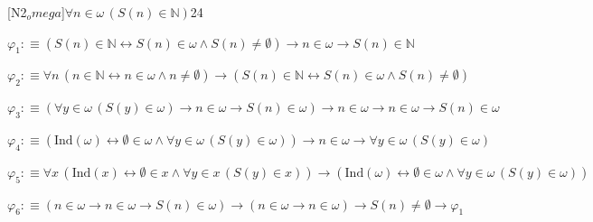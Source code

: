 \begin{fullproof}{[N2$_omega$]}{$\forall n \in \omega\,(S(n) \in \mathbb{N})$}{24}
\begin{abbrevlist}
\item $\varphi_{1} :\equiv (S(n) \in \mathbb{N} \leftrightarrow S(n) \in \omega \land S(n) \neq \emptyset) \to n \in \omega \to S(n) \in \mathbb{N}$
\item $\varphi_{2} :\equiv \forall n\,(n \in \mathbb{N} \leftrightarrow n \in \omega \land n \neq \emptyset) \to (S(n) \in \mathbb{N} \leftrightarrow S(n) \in \omega \land S(n) \neq \emptyset)$
\item $\varphi_{3} :\equiv (\forall y \in \omega\,(S(y) \in \omega) \to n \in \omega \to S(n) \in \omega) \to n \in \omega \to n \in \omega \to S(n) \in \omega$
\item $\varphi_{4} :\equiv (\mathrm{Ind}(\omega) \leftrightarrow \emptyset \in \omega \land \forall y \in \omega\,(S(y) \in \omega)) \to n \in \omega \to \forall y \in \omega\,(S(y) \in \omega)$
\item $\varphi_{5} :\equiv \forall x\,(\mathrm{Ind}(x) \leftrightarrow \emptyset \in x \land \forall y \in x\,(S(y) \in x)) \to (\mathrm{Ind}(\omega) \leftrightarrow \emptyset \in \omega \land \forall y \in \omega\,(S(y) \in \omega))$
\item $\varphi_{6} :\equiv (n \in \omega \to n \in \omega \to S(n) \in \omega) \to (n \in \omega \to n \in \omega) \to S(n) \neq \emptyset \to \varphi_{1}$
\end{abbrevlist}
\end{fullproof}

